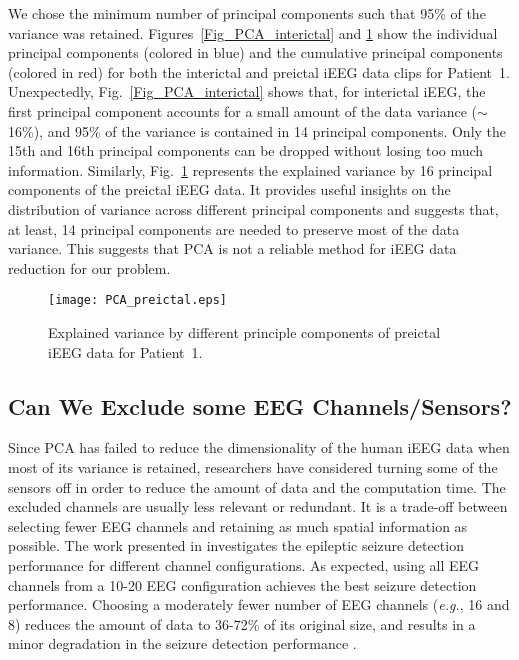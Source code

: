 \documentclass[journal]{IEEEtran}
\begin{document}
We chose the minimum number of principal components such that 95\% of the variance was retained. Figures~\ref{Fig_PCA_interictal} and \ref{Fig_PCA_preictal} show the individual principal components (colored in blue) and the cumulative principal components (colored in red) for both the interictal and preictal iEEG data clips for Patient~1. Unexpectedly, Fig.~\ref{Fig_PCA_interictal} shows that, for interictal iEEG, the first principal component accounts for a small amount of the data variance ($\sim$16\%), and 95\% of the variance is contained in 14 principal components. Only the 15th and 16th principal components can be dropped without losing too much information. Similarly, Fig.~\ref{Fig_PCA_preictal} represents the explained variance by 16 principal components of the preictal iEEG data. It provides useful insights on the distribution of variance across different principal components and suggests that, at least, 14 principal components are needed to preserve most of the data variance. This suggests that PCA is not a reliable method for iEEG data reduction for our problem. 



\begin{figure}[!t]\centering
	\texttt{[image: PCA\_preictal.eps]}
	\caption{Explained variance by different principle components of preictal iEEG data for Patient~1.}
	\label{Fig_PCA_preictal}
\end{figure}

\subsection{Can We Exclude some EEG Channels/Sensors?}

Since PCA has failed to reduce the dimensionality of the human iEEG data when most of its variance is retained, researchers have considered turning some of the sensors off in order to reduce the amount of data and the computation time. The excluded channels are usually less relevant or redundant. It is a trade-off between selecting fewer EEG channels and retaining as much spatial information as possible. The work presented in \cite{shah2017optimizing} investigates the epileptic seizure detection performance for different channel configurations. As expected, using all EEG channels from a 10-20 EEG configuration achieves the best seizure detection performance. Choosing a moderately fewer number of EEG channels (\textit{e.g.}, 16 and 8) reduces the amount of data to 36-72\% of its original size, and results in a minor degradation in the seizure detection performance \cite{shah2017optimizing}.  
\end{document}
